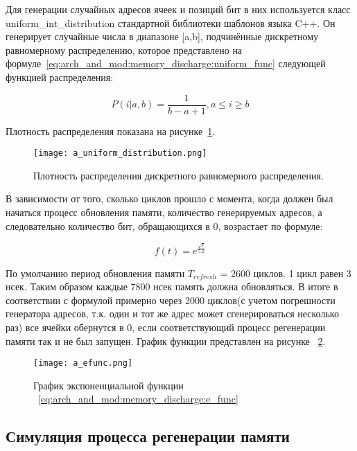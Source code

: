 Для генерации случайных адресов ячеек и позиций бит в них используется класс uniform\_int\_distribution стандартной библиотеки шаблонов языка C++. 
Он генерирует случайные числа в диапазоне [a,b], подчинённые дискретному равномерному распределению, которое представлено на формуле~\ref{eq:arch_and_mod:memory_discharge:uniform_func} следующей функцией распределения:

\begin{equation}
  \label{eq:arch_and_mod:memory_discharge:uniform_func}
  P(i|a,b) = \frac{1}
           {b-a+1}, a \le i \ge b
\end{equation}

Плотность распределения показана на рисунке~\ref{fig:domain:tests:uniform_distribution}.

\begin{figure}[ht]
\centering
  \texttt{[image: a\_uniform\_distribution.png]}  
  \caption{ Плотность распределения дискретного равномерного распределения. }
  \label{fig:domain:tests:uniform_distribution}
\end{figure}

В зависимости от того, сколько циклов прошло с момента, когда должен был начаться процесс обновления памяти, количество генерируемых адресов, а следовательно количество бит, обращающихся в 0, возрастает по формуле:

\begin{equation}
  \label{eq:arch_and_mod:memory_discharge:e_func}
  f(t) = e^{\frac{\sqrt{t}}
           {5.2}}
\end{equation}

По умолчанию период обновления памяти $T_{refresh}$ = 2600 циклов. 1 цикл равен 3 нсек. Таким образом каждые 7800 нсек память должна обновляться. В итоге в соответствии с формулой примерно через 2000 циклов(с учетом погрешности генератора адресов, т.к. один и тот же адрес может сгенерироваться несколько раз) все ячейки обернутся в 0, если соответствующий процесс регенерации памяти так и не был запущен. График функции представлен на рисунке ~\ref{fig:arch_and_mod:memory_discharge:efunc_grafic}.

\begin{figure}[ht]
\centering
  \texttt{[image: a\_efunc.png]}  
  \caption{ График экспоненциальной функции ~\ref{eq:arch_and_mod:memory_discharge:e_func} }
  \label{fig:arch_and_mod:memory_discharge:efunc_grafic}
\end{figure}

\subsection{Симуляция процесса регенерации памяти}
\label{sub:arch_and_mod:memory_refresh}

